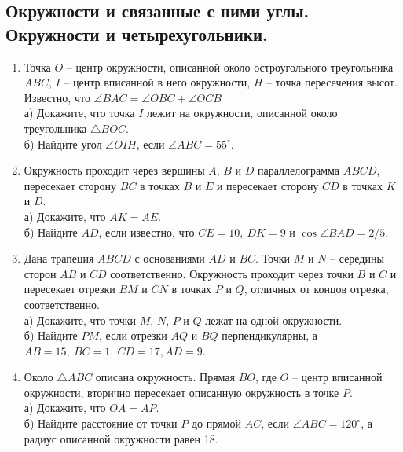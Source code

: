 \documentclass[12pt]{article}
\begin{document}



\subsection{Окружности и связанные с ними углы. Окружности и четырехугольники.}

    \begin{enumerate}[start=1,label={\itshape\bfseries \arabic*.}]
        \item Точка $O$ -- центр окружности, описанной около остроугольного треугольника $ABC$, $I$ -- центр вписанной в него окружности, $H$ -- точка пересечения высот. Известно, что $\angle BAC = \angle OBC + \angle OCB$\\
        а) Докажите, что точка $I$ лежит на окружности, описанной около треугольника $\triangle BOC$.\\
        б) Найдите угол $\angle OIH$, если $\angle ABC = 55^{\circ}$.


        \item Окружность проходит через вершины $A$, $B$ и $D$ параллелограмма $ABCD$, пересекает сторону $BC$ в точках $B$ и $E$ и пересекает сторону $CD$ в точках $K$ и $D$.\\
        а) Докажите, что $AK = AE$.\\
        б) Найдите $AD$, если известно, что $CE = 10, \ DK = 9$ и $\cos\angle BAD = 2/5$.


        \item Дана трапеция $ABCD$ с основаниями $AD$ и $BC$. Точки $M$ и $N$ -- середины сторон $AB$ и $CD$ соответственно. Окружность проходит через точки $B$ и $C$ и пересекает отрезки $BM$ и $CN$ в точках $P$ и $Q$, отличных от концов отрезка, соответственно. \\
        а) Докажите, что точки $M$, $N$, $P$ и $Q$ лежат на одной окружности.\\
        б) Найдите $PM$, если отрезки $AQ$ и $BQ$ перпендикулярны, а $AB = 15, \ BC = 1, \ CD = 17, AD = 9$.

        \item Около $\triangle ABC$ описана окружность. Прямая $BO$, где $O$ -- центр вписанной окружности, вторично пересекает описанную окружность в точке $P$.\\
        а) Докажите, что $OA = AP$.\\
        б) Найдите расстояние от точки $P$ до прямой $AC$, если $\angle ABC = 120^{\circ}$, а радиус описанной окружности равен 18.


\end{enumerate}
\end{document}
